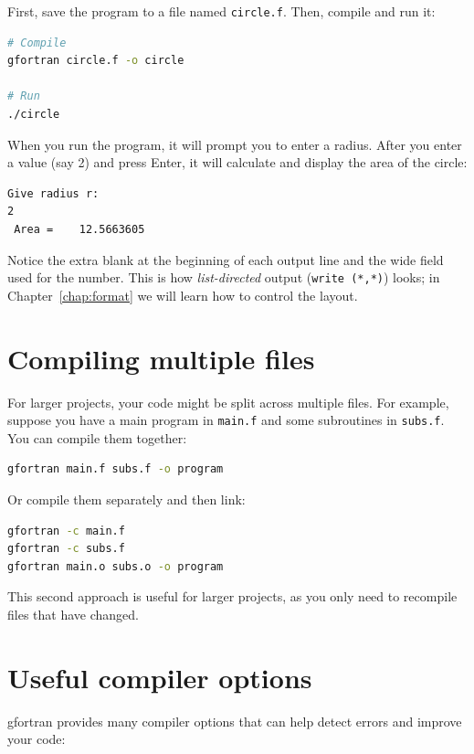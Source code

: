 First, save the program to a file named \texttt{circle.f}. Then, compile and run it:

\begin{lstlisting}[language=bash]
# Compile
gfortran circle.f -o circle

# Run
./circle
\end{lstlisting}

When you run the program, it will prompt you to enter a radius. After you enter a value (say 2) and press Enter, it will calculate and display the area of the circle:

\begin{lstlisting}[style=output]
 Give radius r:
2
 Area =    12.5663605
\end{lstlisting}

Notice the extra blank at the beginning of each output line and the wide field used for the number. This is how \emph{list-directed} output (\texttt{write (*,*)}) looks; in Chapter~\ref{chap:format} we will learn how to control the layout.

\section{Compiling multiple files}

For larger projects, your code might be split across multiple files. For example, suppose you have a main program in \texttt{main.f} and some subroutines in \texttt{subs.f}. You can compile them together:

\begin{lstlisting}[language=bash]
gfortran main.f subs.f -o program
\end{lstlisting}

Or compile them separately and then link:

\begin{lstlisting}[language=bash]
gfortran -c main.f
gfortran -c subs.f
gfortran main.o subs.o -o program
\end{lstlisting}

This second approach is useful for larger projects, as you only need to recompile files that have changed.

\section{Useful compiler options}

gfortran provides many compiler options that can help detect errors and improve your code:

